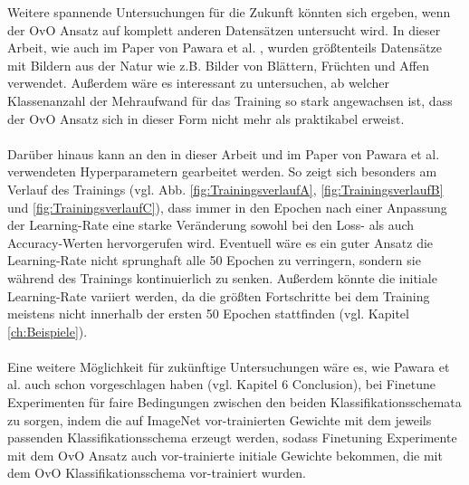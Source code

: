 \newpage

Weitere spannende Untersuchungen für die Zukunft könnten sich ergeben, wenn der OvO Ansatz auf komplett anderen Datensätzen untersucht wird. In dieser Arbeit, wie auch im Paper von Pawara et al. \cite{pawaraPaper}, wurden größtenteils Datensätze mit Bildern aus der Natur wie z.B. Bilder von Blättern, Früchten und Affen verwendet. Außerdem wäre es interessant zu untersuchen, ab welcher Klassenanzahl der Mehraufwand für das Training so stark angewachsen ist, dass der OvO Ansatz sich in dieser Form nicht mehr als praktikabel erweist.\\\\

Darüber hinaus kann an den in dieser Arbeit und im Paper von Pawara et al. \cite{pawaraPaper} verwendeten Hyperparametern gearbeitet werden. So zeigt sich besonders am Verlauf des Trainings (vgl. Abb. \ref{fig:TrainingsverlaufA}, \ref{fig:TrainingsverlaufB} und \ref{fig:TrainingsverlaufC}), dass immer in den Epochen nach einer Anpassung der Learning-Rate eine starke Veränderung sowohl bei den Loss- als auch Accuracy-Werten hervorgerufen wird. Eventuell wäre es ein guter Ansatz die Learning-Rate nicht sprunghaft alle 50 Epochen zu verringern, sondern sie während des Trainings kontinuierlich zu senken. Außerdem könnte die initiale Learning-Rate variiert werden, da die größten Fortschritte bei dem Training meistens nicht innerhalb der ersten 50 Epochen stattfinden (vgl. Kapitel \ref{ch:Beispiele}).\\\\

Eine weitere Möglichkeit für zukünftige Untersuchungen wäre es, wie Pawara et al. auch schon vorgeschlagen haben (vgl. \cite{pawaraPaper} Kapitel 6 Conclusion), bei Finetune Experimenten für faire Bedingungen zwischen den beiden Klassifikationsschemata zu sorgen, indem die auf ImageNet \cite{imagenet} vor-trainierten Gewichte mit dem jeweils passenden Klassifikationsschema erzeugt werden, sodass Finetuning Experimente mit dem OvO Ansatz auch vor-trainierte initiale Gewichte bekommen, die mit dem OvO Klassifikationsschema vor-trainiert wurden.
